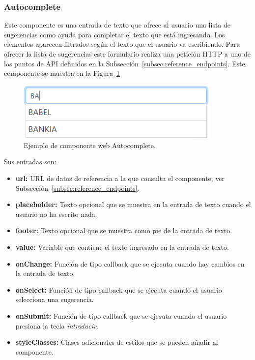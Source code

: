 \documentclass[a4paper, 12pt]{book}
\begin{document}
\subsubsection{Autocomplete}
\label{subsec:wc_autocomplete}
Este componente es una entrada de texto que ofrece al usuario una lista de sugerencias como ayuda para completar el texto que está ingresando.
Los elementos aparecen filtrados según el texto que el usuario va escribiendo.
Para ofrecer la lista de sugerencias este formulario realiza una petición HTTP a uno de los puntos de API definidos en la Subsección~\ref{subsec:reference_endpoints}.
Este componente se muestra en la Figura~\ref{fig:component_autocomplete}

\begin{figure}
  \centering
  \includegraphics[width=10cm, keepaspectratio]{img/Autocomplete.PNG}
  \caption{Ejemplo de componente web Autocomplete.}\label{fig:component_autocomplete}
\end{figure}

Sus entradas son:

		\begin{itemize}
		\item \textbf{url:} URL de datos de referencia a la que consulta el componente, ver Subsección~\ref{subsec:reference_endpoints}.
		\item \textbf{placeholder:} Texto opcional que se muestra en la entrada de texto cuando el usuario no ha escrito nada.
		\item \textbf{footer:} Texto opcional que se muestra como pie de la entrada de texto.
		\item \textbf{value:} Variable que contiene el texto ingresado en la entrada de texto.
		\item \textbf{onChange:} Función de tipo callback que se ejecuta cuando hay cambios en la entrada de texto.
		\item \textbf{onSelect:} Función de tipo callback que se ejecuta cuando el usuario selecciona una sugerencia.
		\item \textbf{onSubmit:} Función de tipo callback que se ejecuta cuando el usuario presiona la tecla \emph{introducir}.
		\item \textbf{styleClasses:} Clases adicionales de estilos que se pueden añadir al componente.
		\end{itemize}
\end{document}
